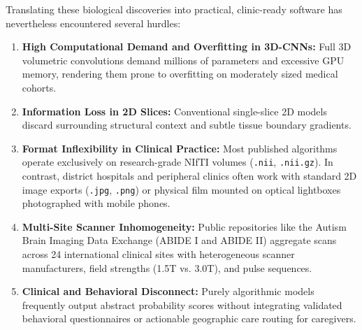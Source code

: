 \documentclass[conference]{IEEEtran}
\begin{document}
Translating these biological discoveries into practical, clinic-ready software has nevertheless encountered several hurdles:
\begin{enumerate}
    \item \textbf{High Computational Demand and Overfitting in 3D-CNNs:} Full 3D volumetric convolutions demand millions of parameters and excessive GPU memory, rendering them prone to overfitting on moderately sized medical cohorts.
    \item \textbf{Information Loss in 2D Slices:} Conventional single-slice 2D models discard surrounding structural context and subtle tissue boundary gradients.
    \item \textbf{Format Inflexibility in Clinical Practice:} Most published algorithms operate exclusively on research-grade NIfTI volumes (\texttt{.nii}, \texttt{.nii.gz}). In contrast, district hospitals and peripheral clinics often work with standard 2D image exports (\texttt{.jpg}, \texttt{.png}) or physical film mounted on optical lightboxes photographed with mobile phones.
    \item \textbf{Multi-Site Scanner Inhomogeneity:} Public repositories like the Autism Brain Imaging Data Exchange (ABIDE I and ABIDE II) \cite{dimartino2014autism, dimartino2017abide2} aggregate scans across 24 international clinical sites with heterogeneous scanner manufacturers, field strengths (1.5T vs. 3.0T), and pulse sequences.
    \item \textbf{Clinical and Behavioral Disconnect:} Purely algorithmic models frequently output abstract probability scores without integrating validated behavioral questionnaires or actionable geographic care routing for caregivers.
\end{enumerate}
\end{document}
